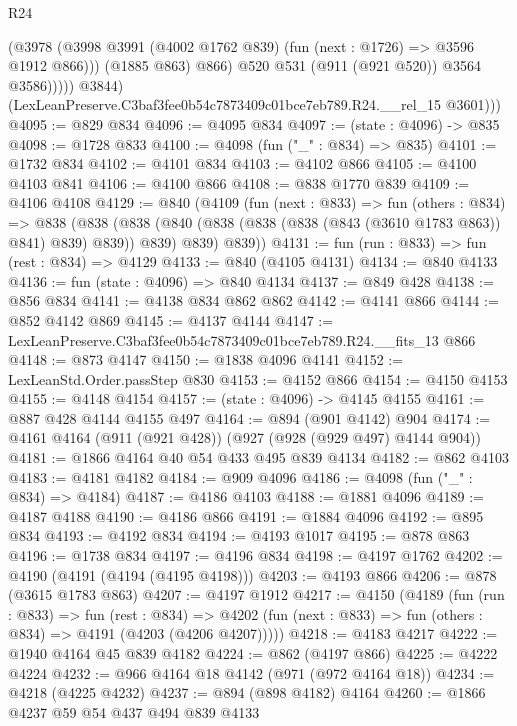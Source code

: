 \begin{lexlean}{R24}
\begin{coremodule}
                      (@3978
                        (@3998 @3991 (@4002 @1762 @839) (fun (next : @1726) => @3596 @1912 @866)))
                      (@1885 @863)
                      @866)
                    @520
                    @531
                    (@911 (@921 @520))
                    @3564
                    @3586)))))
          @3844)
        (LexLeanPreserve.C3baf3fee0b54c7873409c01bce7eb789.R24.__rel_15 @3601)))
@4095 := @829 @834
@4096 := @4095 @834
@4097 := (state : @4096) -> @835
@4098 := @1728 @833
@4100 := @4098 (fun ("_" : @834) => @835)
@4101 := @1732 @834
@4102 := @4101 @834
@4103 := @4102 @866
@4105 := @4100 @4103 @841
@4106 := @4100 @866
@4108 := @838 @1770 @839
@4109 := @4106 @4108
@4129 := @840
    (@4109
      (fun (next : @833) =>
      fun (others : @834) =>
      @838
        (@838 (@838 (@840 (@838 (@838 (@838 (@843 (@3610 @1783 @863)) @841) @839) @839)) @839) @839)
        @839))
@4131 := fun (run : @833) => fun (rest : @834) => @4129
@4133 := @840 (@4105 @4131)
@4134 := @840 @4133
@4136 := fun (state : @4096) => @840 @4134
@4137 := @849 @428
@4138 := @856 @834
@4141 := @4138 @834 @862 @862
@4142 := @4141 @866
@4144 := @852 @4142 @869
@4145 := @4137 @4144
@4147 := LexLeanPreserve.C3baf3fee0b54c7873409c01bce7eb789.R24.__fits_13 @866
@4148 := @873 @4147
@4150 := @1838 @4096 @4141
@4152 := LexLeanStd.Order.passStep @830
@4153 := @4152 @866
@4154 := @4150 @4153
@4155 := @4148 @4154
@4157 := (state : @4096) -> @4145 @4155
@4161 := @887 @428 @4144 @4155 @497
@4164 := @894 (@901 @4142) @904
@4174 := @4161 @4164 (@911 (@921 @428)) (@927 (@928 (@929 @497) @4144 @904))
@4181 := @1866 @4164 @40 @54 @433 @495 @839 @4134
@4182 := @862 @4103
@4183 := @4181 @4182
@4184 := @909 @4096
@4186 := @4098 (fun ("_" : @834) => @4184)
@4187 := @4186 @4103
@4188 := @1881 @4096
@4189 := @4187 @4188
@4190 := @4186 @866
@4191 := @1884 @4096
@4192 := @895 @834
@4193 := @4192 @834
@4194 := @4193 @1017
@4195 := @878 @863
@4196 := @1738 @834
@4197 := @4196 @834
@4198 := @4197 @1762
@4202 := @4190 (@4191 (@4194 (@4195 @4198)))
@4203 := @4193 @866
@4206 := @878 (@3615 @1783 @863)
@4207 := @4197 @1912
@4217 := @4150
    (@4189
      (fun (run : @833) =>
      fun (rest : @834) =>
      @4202 (fun (next : @833) => fun (others : @834) => @4191 (@4203 (@4206 @4207)))))
@4218 := @4183 @4217
@4222 := @1940 @4164 @45 @839 @4182
@4224 := @862 (@4197 @866)
@4225 := @4222 @4224
@4232 := @966 @4164 @18 @4142 (@971 (@972 @4164 @18))
@4234 := @4218 (@4225 @4232)
@4237 := @894 (@898 @4182) @4164
@4260 := @1866
    @4237
    @59
    @54
    @437
    @494
    @839
    @4133

\end{coremodule}
\end{lexlean}
